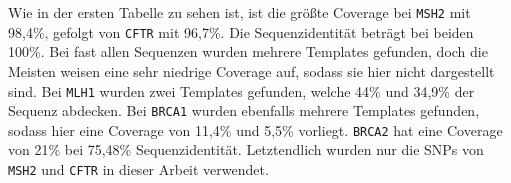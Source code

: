 \begin{table}[H]
    \centering
    \caption{Tabelle aller Gene des \emph{expert panels} mit mindestens 10 pathogenen \ac{SNP}s. Die verwendeten Gene sind grün markiert.}
    \label{tab:expert_snps}
\end{table}

Wie in der ersten Tabelle zu sehen ist, ist die größte Coverage bei \texttt{MSH2} mit 98,4\%, gefolgt von \texttt{CFTR} mit 96,7\%. Die Sequenzidentität beträgt bei beiden 100\%. Bei fast allen Sequenzen wurden mehrere Templates gefunden, doch die Meisten weisen eine sehr niedrige Coverage auf, sodass sie hier nicht dargestellt sind. Bei \texttt{MLH1} wurden zwei Templates gefunden, welche 44\% und 34,9\% der Sequenz abdecken. Bei \texttt{BRCA1} wurden ebenfalls mehrere Templates gefunden, sodass hier eine Coverage von 11,4\% und 5,5\% vorliegt. \texttt{BRCA2} hat eine Coverage von 21\% bei 75,48\% Sequenzidentität. Letztendlich wurden nur die \ac{SNP}s von \texttt{MSH2} und \texttt{CFTR} in dieser Arbeit verwendet.

